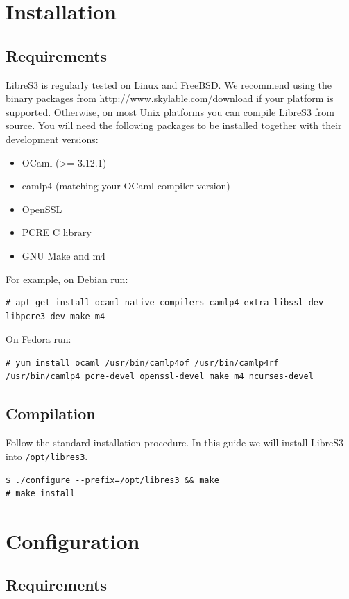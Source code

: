 \chapter{Installation}

\section*{Requirements}

LibreS3 is regularly tested on Linux and FreeBSD. We recommend using the
binary packages from \url{http://www.skylable.com/download} if your platform
is supported. Otherwise, on most Unix platforms you can compile LibreS3
from source. You will need the following packages to be installed together with their
development versions:
\begin{itemize}
    \item OCaml (>= 3.12.1)
    \item camlp4 (matching your OCaml compiler version)
    \item OpenSSL
    \item PCRE C library
    \item GNU Make and m4
\end{itemize}
For example, on Debian run:
\small
\begin{lstlisting}
# apt-get install ocaml-native-compilers camlp4-extra libssl-dev libpcre3-dev make m4
\end{lstlisting}
\LARGE
On Fedora run:
\small
\begin{lstlisting}
# yum install ocaml /usr/bin/camlp4of /usr/bin/camlp4rf /usr/bin/camlp4 pcre-devel openssl-devel make m4 ncurses-devel
\end{lstlisting}
\LARGE

\newpage
\section*{Compilation}

Follow the standard installation procedure. In this guide we will install
LibreS3 into \verb+/opt/libres3+.
\small
\begin{lstlisting}
$ ./configure --prefix=/opt/libres3 && make
# make install
\end{lstlisting}
\LARGE

\chapter{Configuration}

\section*{Requirements}

